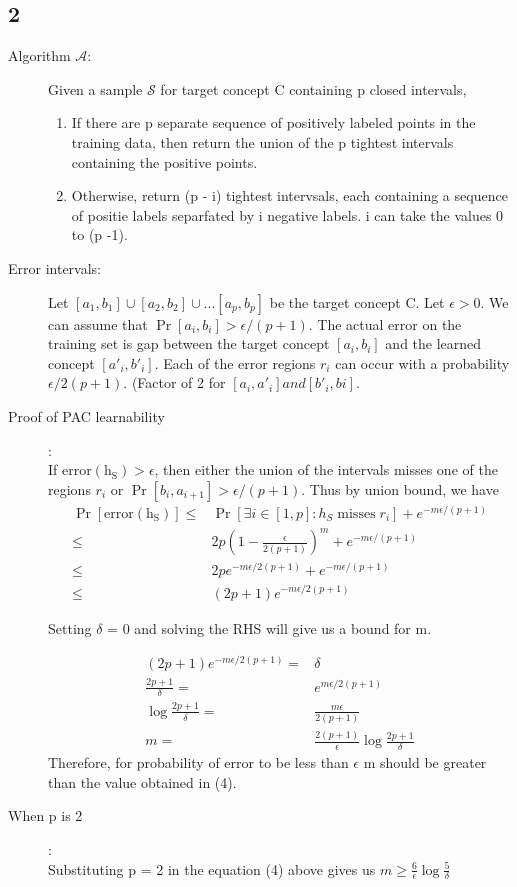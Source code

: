 \documentclass{article}
\begin{document}
\subsection*{2}
\begin{description}
  \item[Algorithm \( \mathcal{A} \):]  Given a sample \( \mathcal{S}\) for target concept C containing p closed intervals,
    \begin{enumerate}
      \item If there are p separate sequence of positively labeled points in the training data, then return the union of the p tightest intervals containing the positive points.
      \item Otherwise, return (p - i) tightest intervsals, each containing a sequence of positie labels separfated by i negative labels.  i can take the values 0 to (p -1).
    \end{enumerate}
  \item[Error intervals:] Let \( [a_{1}, b_{1}] \cup [a_{2}, b_{2}] \cup ... [a_{p}, b_{p}] \) be the target concept C.  Let \( \epsilon > 0\). We can assume that \(\Pr[a_{i}, b_{i}] > \epsilon/(p + 1) \).  The actual error on the training set is gap between the target concept \( [a_{i}, b_{i}]\) and the learned concept \( [a'_{i}, b'_{i}] \).  Each of the error regions \( r_{i}\) can occur with a probability \( \epsilon/2(p + 1) \). (Factor of 2 for \( [a_{i}, a'_{i}] and [b'_{i}, b{i}] \).
  \item[Proof of PAC learnability]:\\
    If \( \mathrm{error(h_{S})} > \epsilon\), then either the union of the intervals misses one of the regions \( r_{i} \) or \( \Pr[b_{i}, a_{i+1}] > \epsilon/(p+1)\).  Thus by union bound, we have
    \begin{align*}
      \Pr[\mathrm{error(h_{S})}] \le & \Pr[\exists{i} \in [1, p]: h_{S} \; \mathrm{misses} \; r_{i}] + e^{-m\epsilon/(p+1)}\\
      \le & 2p(1-\frac{\epsilon}{2(p+1)})^{m} + e^{-m\epsilon/(p+1)}\\
      \le & 2pe^{-m\epsilon/{2(p+1)}} + e^{-m\epsilon/(p+1)}\\
      \le & (2p+1)e^{-m\epsilon/2(p+1)}
    \end{align*}

    Setting \( \delta \) = 0 and solving the RHS will give us a bound for m.

    \begin{align}
      (2p+1)e^{-m\epsilon/2(p+1)} = & \delta\\
      \frac{2p+1}{\delta} = & e^{m\epsilon/2(p+1)}\\
      \log{\frac{2p+1}{\delta}} = & \frac{m\epsilon}{2(p+1)}\\
      m = & \frac{2(p+1)}{\epsilon} \log{\frac{2p+1}{\delta}}
    \end{align}
    Therefore, for probability of error to be less than \(\epsilon\) m should be greater than the value obtained in (4).
  \item[When p is 2]:\\
    Substituting p = 2 in the equation (4) above gives us \(m \ge \frac{6}{\epsilon} \log{\frac{5}{\delta}}\)

\end{description}
\end{document}
